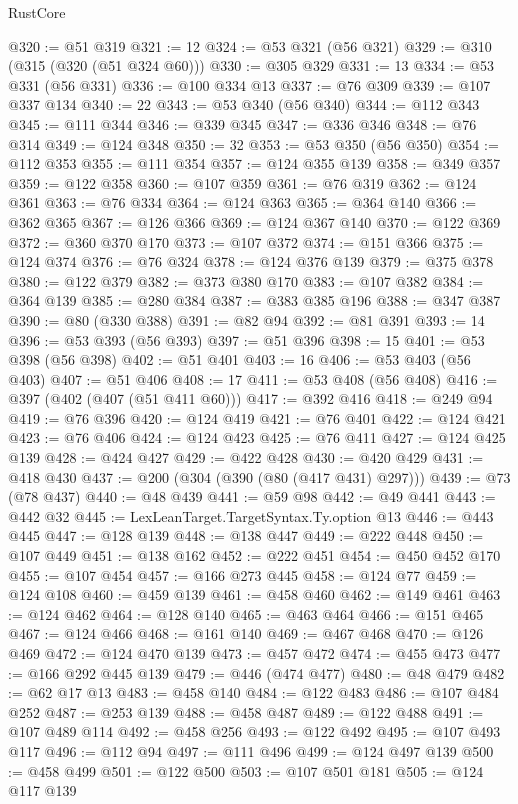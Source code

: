 \begin{lexlean}{RustCore}
\begin{coremodule}
@320 := @51 @319
@321 := 12
@324 := @53 @321 (@56 @321)
@329 := @310 (@315 (@320 (@51 @324 @60)))
@330 := @305 @329
@331 := 13
@334 := @53 @331 (@56 @331)
@336 := @100 @334 @13
@337 := @76 @309
@339 := @107 @337 @134
@340 := 22
@343 := @53 @340 (@56 @340)
@344 := @112 @343
@345 := @111 @344
@346 := @339 @345
@347 := @336 @346
@348 := @76 @314
@349 := @124 @348
@350 := 32
@353 := @53 @350 (@56 @350)
@354 := @112 @353
@355 := @111 @354
@357 := @124 @355 @139
@358 := @349 @357
@359 := @122 @358
@360 := @107 @359
@361 := @76 @319
@362 := @124 @361
@363 := @76 @334
@364 := @124 @363
@365 := @364 @140
@366 := @362 @365
@367 := @126 @366
@369 := @124 @367 @140
@370 := @122 @369
@372 := @360 @370 @170
@373 := @107 @372
@374 := @151 @366
@375 := @124 @374
@376 := @76 @324
@378 := @124 @376 @139
@379 := @375 @378
@380 := @122 @379
@382 := @373 @380 @170
@383 := @107 @382
@384 := @364 @139
@385 := @280 @384
@387 := @383 @385 @196
@388 := @347 @387
@390 := @80 (@330 @388)
@391 := @82 @94
@392 := @81 @391
@393 := 14
@396 := @53 @393 (@56 @393)
@397 := @51 @396
@398 := 15
@401 := @53 @398 (@56 @398)
@402 := @51 @401
@403 := 16
@406 := @53 @403 (@56 @403)
@407 := @51 @406
@408 := 17
@411 := @53 @408 (@56 @408)
@416 := @397 (@402 (@407 (@51 @411 @60)))
@417 := @392 @416
@418 := @249 @94
@419 := @76 @396
@420 := @124 @419
@421 := @76 @401
@422 := @124 @421
@423 := @76 @406
@424 := @124 @423
@425 := @76 @411
@427 := @124 @425 @139
@428 := @424 @427
@429 := @422 @428
@430 := @420 @429
@431 := @418 @430
@437 := @200 (@304 (@390 (@80 (@417 @431) @297)))
@439 := @73 (@78 @437)
@440 := @48 @439
@441 := @59 @98
@442 := @49 @441
@443 := @442 @32
@445 := LexLeanTarget.TargetSyntax.Ty.option @13
@446 := @443 @445
@447 := @128 @139
@448 := @138 @447
@449 := @222 @448
@450 := @107 @449
@451 := @138 @162
@452 := @222 @451
@454 := @450 @452 @170
@455 := @107 @454
@457 := @166 @273 @445
@458 := @124 @77
@459 := @124 @108
@460 := @459 @139
@461 := @458 @460
@462 := @149 @461
@463 := @124 @462
@464 := @128 @140
@465 := @463 @464
@466 := @151 @465
@467 := @124 @466
@468 := @161 @140
@469 := @467 @468
@470 := @126 @469
@472 := @124 @470 @139
@473 := @457 @472
@474 := @455 @473
@477 := @166 @292 @445 @139
@479 := @446 (@474 @477)
@480 := @48 @479
@482 := @62 @17 @13
@483 := @458 @140
@484 := @122 @483
@486 := @107 @484 @252
@487 := @253 @139
@488 := @458 @487
@489 := @122 @488
@491 := @107 @489 @114
@492 := @458 @256
@493 := @122 @492
@495 := @107 @493 @117
@496 := @112 @94
@497 := @111 @496
@499 := @124 @497 @139
@500 := @458 @499
@501 := @122 @500
@503 := @107 @501 @181
@505 := @124 @117 @139

\end{coremodule}
\end{lexlean}
